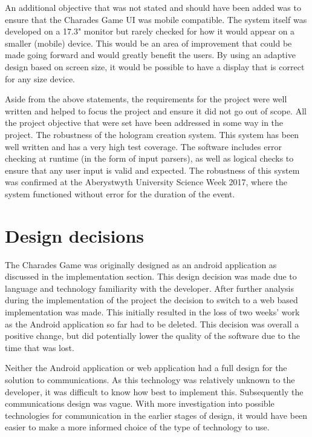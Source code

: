 An additional objective that was not stated and should have been added was to ensure that the Charades Game UI was mobile compatible. The system itself was developed on a 17.3" monitor but rarely checked for how it would appear on a smaller (mobile) device. This would be an area of improvement that could be made going forward and would greatly benefit the users. By using an adaptive design based on screen size, it would be possible to have a display that is correct for any size device.

Aside from the above statements, the requirements for the project were well written and helped to focus the project and ensure it did not go out of scope. All the project objective that were set have been addressed in some way in the project. The robustness of the hologram creation system. This system has been well written and has a very high test coverage. The software includes error checking at runtime (in the form of input parsers), as well as logical checks to ensure that any user input is valid and expected. The robustness of this system was confirmed at the Aberystwyth University Science Week 2017, where the system functioned without error for the duration of the event.


\section{Design decisions}

The Charades Game was originally designed as an android application as discussed in the implementation section. This design decision was made due to language and technology familiarity with the developer. After further analysis during the implementation of the project the decision to switch to a web based implementation was made. This initially resulted in the loss of two weeks' work as the Android application so far had to be deleted. This decision was overall a positive change, but did potentially lower the quality of the software due to the time that was lost.

Neither the Android application or web application had a full design for the solution to communications. As this technology was relatively unknown to the developer, it was difficult to know how best to implement this. Subsequently the communications design was vague. With more investigation into possible technologies for communication in the earlier stages of design, it would have been easier to make a more informed choice of the type of technology to use.

